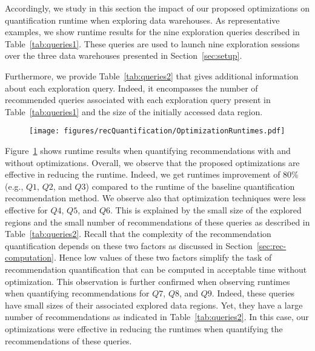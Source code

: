 Accordingly, we study in this section the impact of our proposed optimizations on quantification runtime when exploring data warehouses. 
As representative examples, we show runtime results for the nine exploration queries described in Table~\ref{tab:queries1}.
These queries are used to launch nine exploration sessions over the three data warehouses presented in Section~\ref{sec:setup}.

Furthermore, we provide Table~\ref{tab:queries2} that gives additional information about each exploration query. Indeed, it encompasses  the number of recommended queries associated with each exploration query present in Table~\ref{tab:queries1} and the size of the initially accessed data region. 


\begin{figure}[t]
  \centering
  \texttt{[image: figures/recQuantification/OptimizationRuntimes.pdf]}
  \label{fig:runtimeOpt}
\end{figure}

Figure~\ref{fig:runtimeOpt} shows runtime results when quantifying recommendations with and without optimizations.
Overall, we observe that the proposed optimizations are effective in reducing the runtime. Indeed, we get runtimes improvement of 80\% (e.g., $Q1$, $Q2$, and $Q3$) compared to the runtime of the baseline quantification recommendation method.
We observe also that optimization techniques were less effective for $Q4$, $Q5$, and $Q6$. This is explained by the small size of the explored regions and the small number of recommendations of these queries as described in Table~\ref{tab:queries2}.
Recall that the complexity of the recommendation quantification depends on these two factors as discussed in Section~\ref{sec:rec-computation}. 
Hence low values of these two factors simplify the task of recommendation quantification that can be computed in acceptable time without optimization.
This observation is further confirmed when observing runtimes when quantifying recommendations for $Q7$, $Q8$, and $Q9$. Indeed, these queries have small sizes of their associated explored data regions. Yet, they have a large number of recommendations as indicated in Table~\ref{tab:queries2}. 
In this case, our optimizations were effective in reducing the runtimes when quantifying the recommendations of these queries.


